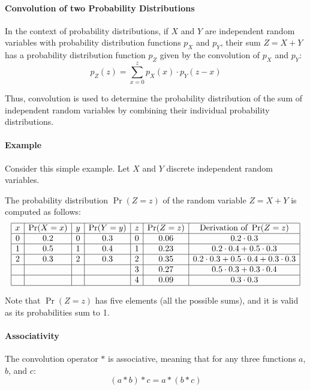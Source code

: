 \documentclass{masterthesis}
\begin{document}
\paragraph*{Convolution of two Probability Distributions}
In the context of probability distributions, if \(X\) and \(Y\) are independent random variables with probability distribution functions \(p_X\) and \(p_Y\), their sum \(Z = X + Y\) has a probability distribution function \(p_Z\) given by the convolution of \(p_X\) and \(p_Y\):
\begin{equation}\label{eq:convolution}
    p_Z(z) = \sum_{x=0}^{z} p_X(x) \cdot p_Y(z - x)
\end{equation}

Thus, convolution is used to determine the probability distribution of the sum of independent random variables by combining their individual probability distributions.

\paragraph*{Example} 

Consider this simple example. Let $X$ and $Y$ discrete independent random variables. 

The probability distribution $\Pr(Z = z)$ of the random variable $Z = X + Y$ is computed as follows:
\begin{equation*}
    \begin{array}{|c|c|c|c|c|c|c|}
        \hline
        x & \Pr(X = x) & y & \Pr(Y = y) & z & \Pr(Z = z) & \text{Derivation of }\Pr(Z = z)\\
        \hline
        0 & 0.2 & 0 & 0.3 & 0 & 0.06 & 0.2 \cdot 0.3 \\
        \hline
        1 & 0.5 & 1 & 0.4 & 1 & 0.23 & 0.2 \cdot 0.4 + 0.5 \cdot 0.3 \\
        \hline
        2 & 0.3 & 2 & 0.3 & 2 & 0.35 & 0.2 \cdot 0.3 + 0.5 \cdot 0.4 + 0.3 \cdot 0.3 \\
        \hline
         &  &  &  & 3 & 0.27 & 0.5 \cdot 0.3 + 0.3 \cdot 0.4 \\
        \hline
         &  &  &  & 4 & 0.09 & 0.3 \cdot 0.3 \\
        \hline
    \end{array}
\end{equation*}

Note that $\Pr(Z = z)$ has five elements (all the possible sums), and it is valid as its probabilities sum to 1.

\paragraph*{Associativity}
\begin{samepage}
    The convolution operator \( * \) is associative, meaning that for any three functions \(a\), \(b\), and \(c\):
    \begin{equation}\label{eq:convolution_associativity} 
        (a * b) * c = a * (b * c)
    \end{equation}        
\end{samepage}
\end{document}
